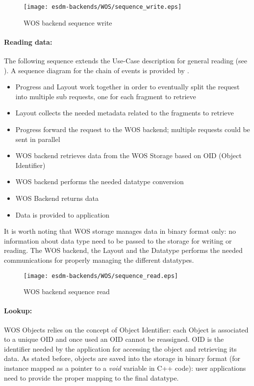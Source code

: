 \begin{figure}
	\centering
	\texttt{[image: esdm-backends/WOS/sequence\_write.eps]}
	\caption{WOS backend sequence write}
	\label{fig:WOS backend sequence write}
\end{figure}

\paragraph{Reading data:}
The following sequence extends the Use-Case description for general reading (see ).
A sequence diagram for the chain of events is provided by .

\begin{itemize}
	\item Progress and Layout work together in order to eventually split the request into multiple sub requests, one for each fragment to retrieve
	\item Layout collects the needed metadata related to the fragments to retrieve
	\item Progress forward the request to the WOS backend; multiple requests could be sent in parallel
	\item WOS backend retrieves data from the WOS Storage based on OID (Object Identifier)
	\item WOS backend performs the needed datatype conversion
	\item WOS Backend returns data
	\item Data is provided to application
\end{itemize}

It is worth noting that WOS storage manages data in binary format only: no information about data type need to be passed to the storage for writing or reading. The WOS backend, the Layout and the Datatype performs the needed communications for properly managing the different datatypes.

\begin{figure}
	\centering
	\texttt{[image: esdm-backends/WOS/sequence\_read.eps]}
	\caption{WOS backend sequence read}
	\label{fig:WOS backend sequence read}
\end{figure}

\paragraph{Lookup:}
WOS Objects relies on the concept of Object Identifier: each Object is associated to a unique OID and once used an OID cannot be reassigned. OID is the identifier needed by the application for accessing the object and retrieving its data. As stated before, objects are saved into the storage in binary format (for instance mapped as a pointer to a \textit{void} variable in C++ code): user applications need to provide the proper mapping to the final datatype.

